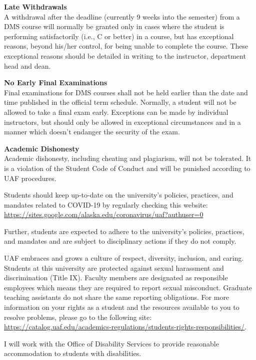 \documentclass[12pt]{article}
\renewcommand{\emph}[1]{\textsf{\textbf{#1}}}
\newcommand{\localhead}[1]{\par\smallskip\textbf{#1}\nobreak\\}%
\def\subheading#1{\localhead{\emph{#1}}}
\begin{document}
\subheading{Late Withdrawals} 
A withdrawal after the deadline
  (currently 9 weeks into the semester) from a DMS course will
  normally be granted only in cases where the student is performing
  satisfactorily (i.e., C or better) in a course, but has exceptional
  reasons, beyond his/her control, for being unable to complete the
  course. These exceptional reasons should be detailed in writing to
  the instructor, department head and dean.

\subheading{No Early Final Examinations}
Final examinations for DMS
  courses shall not be held earlier than the date and time published
  in the official term schedule. Normally, a student will not be
  allowed to take a final exam early. Exceptions can be made by
  individual instructors, but should only be allowed in exceptional
  circumstances and in a manner which doesn't endanger the security of
  the exam.

\subheading{Academic Dishonesty}
Academic dishonesty, including cheating and plagiarism, will not
be tolerated.  It is a violation of the Student Code of Conduct
and will be punished according to UAF procedures.

 
  Students should keep up-to-date on the university's policies, practices, and mandates related to COVID-19 by regularly checking this website: \url{https://sites.google.com/alaska.edu/coronavirus/uaf?authuser=0}

Further, students are expected to adhere to the university's policies, practices, and mandates and are subject to disciplinary actions if they do not comply.

 UAF embraces and grows a culture of respect, diversity, inclusion, and caring. Students at this university are protected against sexual harassment and discrimination (Title IX). Faculty members are designated as responsible employees which means they are required to report sexual misconduct. Graduate teaching assistants do not share the same reporting obligations. For more information on your rights as a student and the resources available to you to resolve problems, please go to the following site: \url{https://catalog.uaf.edu/academics-regulations/students-rights-responsibilities/}.

 I will work with the Office of Disability Services to provide reasonable accommodation to students with disabilities.
\end{document}
